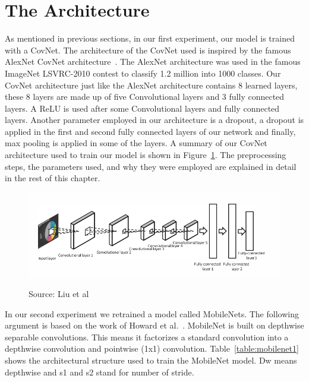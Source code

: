 \documentclass[12pt, a4paper,oneside]{report}
\newcommand{\source}[1]{\vspace{-3pt} \caption*{ Source: {#1}} }
\begin{document}
\section{The Architecture}
As mentioned in previous sections, in our first experiment, our model is trained with a CovNet. The architecture of the CovNet used is inspired by the famous AlexNet CovNet architecture~\cite{krizhevsky2012imagenet}. The AlexNet architecture was used in the famous ImageNet LSVRC-2010 contest to classify 1.2 million into 1000 classes. Our CovNet architecture just like the AlexNet architecture contains 8 learned layers, these 8 layers are made up of five Convolutional layers and 3 fully connected layers. A ReLU is used after some Convolutional layers and fully connected layers. Another parameter employed in our architecture is a dropout, a dropout is applied in the first and second fully connected layers of our network and finally, max pooling is applied in some of the layers. A summary of our CovNet architecture used to train our model is shown in Figure~\ref{fig:archi}. The preprocessing steps, the parameters used, and why they were employed are explained in detail in the rest of this chapter.

\begin{figure}[!htbp]
\centering
\includegraphics [scale= 0.5] {architectur.png}
\label{fig:archi}
\source{Liu et al~\cite{liu2015chart}}
\end{figure}

In our second experiment we retrained a model called MobileNets. The following argument is based on the work of Howard et al.~\cite{howard2017mobilenets}.
MobileNet is built on depthwise separable convolutions. This means it factorizes a standard convolution into a depthwise convolution and pointwise (1x1) convolution. Table~\ref{table:mobilenet1} shows the architectural structure used to train the MobileNet model. Dw means depthwise and s1 and s2 stand for number of stride.
\end{document}
